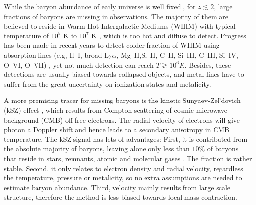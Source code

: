 While the baryon abundance of early universe is well fixed 
\cite{Cooke14,Fukugita98,Komatsu11,Hinshaw13}, 
for $z\lesssim 2$, large fractions of baryons are missing in observations.  
The majority of them are believed to reside in Warm-Hot Intergalactic Mediums (WHIM) with typical temperature of $10^5$ K to $10^7$ K \cite{Pen1999,Soltan06}, which is too hot and diffuse to detect.
Progress has been made in recent years to detect colder fraction of WHIM using absorption lines 
(e.g, H~I, broad Ly$\alpha$, Mg~II,Si~II, C~II, Si~III, C~III, Si~IV, O~VI, O~VII) \cite{Bregman07,Werk14}, 
yet not much detection can reach $T\gtrsim 10^6 K$. 
Besides, these detections are usually biased towards collapsed objects, 
 and metal lines have to suffer from the great uncertainty on ionization states 
and metalicity.

A more promising tracer for missing baryons is the kinetic Sunyaev-Zel'dovich (kSZ) effect \cite{Sunyaev72,Sunyaev80,Vishniac87}, 
which results from Compton scattering of cosmic microwave background (CMB) off free electrons. 
The radial velocity of electrons will give photon a Doppler shift 
and hence leads to a 
secondary anisotropy in CMB temperature.
The kSZ signal has lots of advantages: 
First, it is contributed from the absolute majority of baryons, 
leaving alone only less than $10\%$ of baryons that 
reside in stars, remnants, atomic and molecular gases \cite{Fukugita04}. 
The fraction is rather stable.  
Second, it only relates to electron density and radial velocity, 
regardless the temperature, pressure or metalicity,  
so no extra assumptions are needed to estimate baryon abundance.  
Third, velocity mainly results from large scale structure, 
therefore the method is less biased towards local mass contraction.  

